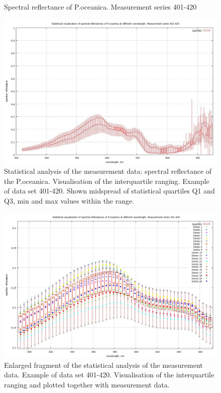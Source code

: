 \documentclass[10pt, a4paper]{article}
\begin{document}
\begin{appendices}
\begin{figure}[h]
\begin{center}
\caption{Spectral reflectance of P.oceanica. Measurement series 401-420}
\label{fig:43}
\end{center}
\end{figure}
\begin{figure}[h]
\begin{center}
\includegraphics[scale=0.20]{GNU-401-420-candles.jpg}
\caption{Statistical analysis of the measurement data: spectral reflectance of the P.oceanica. 
Visualisation of the interquartile ranging. Example of data set 401-420. Shown midspread of  statistical quartiles Q1 and Q3, min and max values within the range.}
\label{fig:44}
\end{center}
\end{figure}
\begin{figure}[H]
\begin{center}
\includegraphics[scale=0.20]{GNU-enlarged-M-401-420.jpg}
\caption{Enlarged fragment of the statistical analysis of the measurement data. Example of data set 401-420. 
Visualisation of the interquartile ranging and plotted together with measurement data.}
\label{fig:45}
\end{center}
\end{figure}
\pagebreak


\end{appendices}
\end{document}
